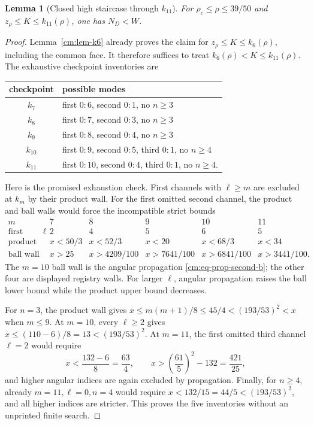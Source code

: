 \documentclass[11pt]{article}
\numberwithin{equation}{section}
\newtheorem{lemma}[theorem]{Lemma}
\theoremstyle{definition}
\theoremstyle{remark}
\begin{document}
\begin{lemma}[Closed high staircase through \(k_{11}\)]
\label{cm:lem-k11}
For \(\rho_c\leq\rho\leq39/50\) and
\(z_\rho\leq K\leq k_{11}(\rho)\), one has \(N_D<W\).
\end{lemma}

\begin{proof}
Lemma~\ref{cm:lem-k6} already proves the claim for
\(z_\rho\leq K\leq k_6(\rho)\), including the common face.  It therefore
suffices to treat \(k_6(\rho)<K\leq k_{11}(\rho)\).
The exhaustive checkpoint inventories are
\begin{center}
\small
\begin{tabular}{c|l}
checkpoint&possible modes\\ \hline
\(k_7\)&first \(0{:}6\), second \(0{:}1\), no \(n\geq3\)\\
\(k_8\)&first \(0{:}7\), second \(0{:}3\), no \(n\geq3\)\\
\(k_9\)&first \(0{:}8\), second \(0{:}4\), no \(n\geq3\)\\
\(k_{10}\)&first \(0{:}9\), second \(0{:}5\), third \(0{:}1\), no \(n\geq4\)\\
\(k_{11}\)&first \(0{:}10\), second \(0{:}4\), third \(0{:}1\), no \(n\geq4\).
\end{tabular}
\end{center}
Here is the promised exhaustion check.  First channels with \(\ell\geq m\)
are excluded at \(k_m\) by their product wall.  For the first omitted second
channel, the product and ball walls would force the incompatible strict
bounds
\[
\begin{array}{c|ccccc}
m&7&8&9&10&11\\ \hline
\text{first omitted }\ell&2&4&5&6&5\\
\text{product wall}&x<50/3&x<52/3&x<20&x<68/3&x<34\\
\text{ball wall}&x>25&x>4209/100&x>7641/100&
x>6841/100&x>3441/100.
\end{array}
\]
The \(m=10\) ball wall is the angular propagation
\eqref{cm:eq-prop-second-b}; the other four are displayed registry walls.
For larger \(\ell\), angular propagation raises the ball lower bound while
the product upper bound decreases.

For \(n=3\), the product wall gives
\(x\leq m(m+1)/8\leq45/4<(193/53)^2<x\) when \(m\leq9\).
At \(m=10\), every \(\ell\geq2\) gives
\(x\leq(110-6)/8=13<(193/53)^2\).  At \(m=11\), the first omitted
third channel \(\ell=2\) would require
\[
 x<\frac{132-6}{8}=\frac{63}{4},
 \qquad
 x>\left(\frac{61}{5}\right)^2-132=\frac{421}{25},
\]
and higher angular indices are again excluded by propagation.  Finally,
for \(n\geq4\), already \(m=11,\ell=0,n=4\) would require
\(x<132/15=44/5<(193/53)^2\), and all higher indices are stricter.
This proves the five inventories without an unprinted finite search.


\end{proof}
\end{document}
